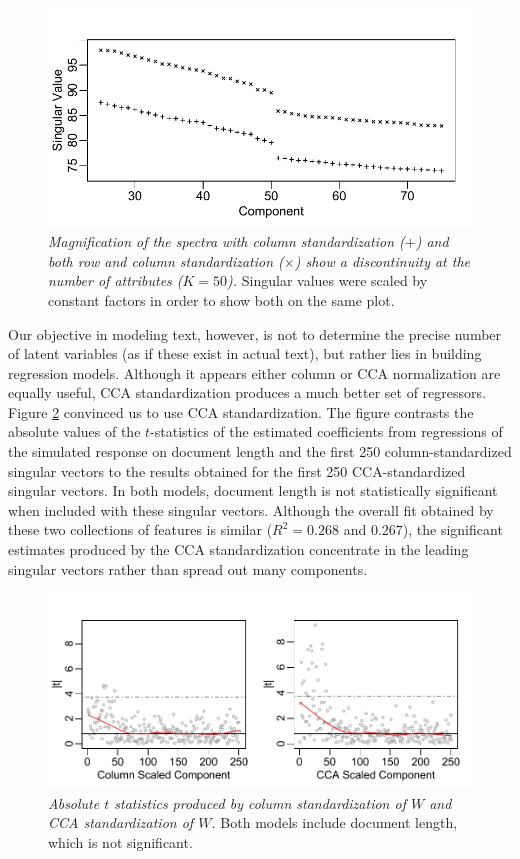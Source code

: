 \documentclass[12pt]{article}
\begin{document}
\begin{figure}
\caption{ \label{fig:gap} 
{ \sl Magnification of the spectra with column standardization ($+$) and both row and column standardization ($\times$) show a discontinuity at the number of attributes ($K=50$).}  Singular values were scaled by constant factors in order to show both on the same plot.}
 \centerline{
 \vspace{0.1in}
 \includegraphics[width=6.0in]{figures/gap} }
 \end{figure}

Our objective in modeling text, however, is not to determine the precise number of latent variables (as if these exist in actual text), but rather lies in building regression models.  Although it  appears either column or CCA normalization are equally useful, CCA  standardization produces a much better set of regressors.  Figure \ref{fig:ccawins} convinced us to use CCA standardization.  The figure contrasts the absolute values of the $t$-statistics of the estimated coefficients from regressions of the simulated response on document length and  the first 250 column-standardized singular vectors to the results obtained for the first 250 CCA-standardized singular vectors. In both models, document length is not statistically significant when included with these singular vectors.  Although the overall fit obtained by these two collections of features is  similar ($R^2 = 0.268$ and $0.267$), the significant estimates produced by the CCA standardization concentrate in the leading singular vectors rather than spread out many components.  


\begin{figure}
\caption{ \label{fig:ccawins} 
{ \sl Absolute $t$ statistics produced by column standardization of $W$ and CCA standardization of $W$.}
  Both models include document length, which is not significant.}
 \centerline{
 \vspace{0.1in}
 \includegraphics[width=6.0in]{figures/ccawins} }
 \end{figure}
\end{document}
